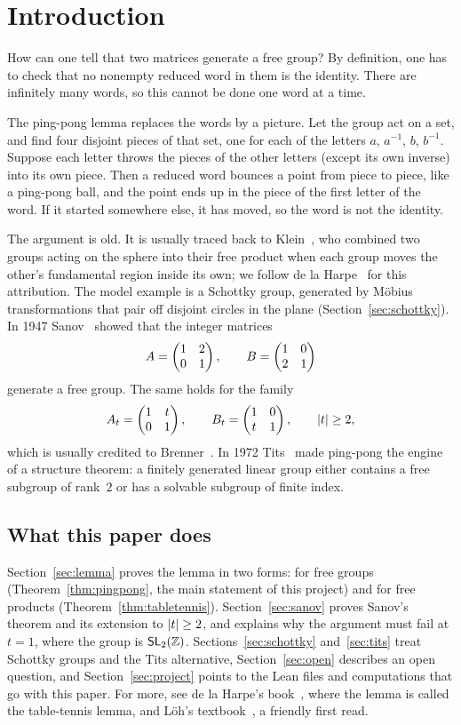 \section{Introduction}\label{sec:introduction}

How can one tell that two matrices generate a free group? By definition, one
has to check that no nonempty reduced word in them is the identity. There are
infinitely many words, so this cannot be done one word at a time.

The ping-pong lemma replaces the words by a picture. Let the group act on a set,
and find four disjoint pieces of that set, one for each of the letters $a$,
$a^{-1}$, $b$, $b^{-1}$. Suppose each letter throws the pieces of the other
letters (except its own inverse) into its own piece. Then a reduced word
bounces a point from piece to piece, like a ping-pong ball, and the point ends
up in the piece of the first letter of the word. If it started somewhere else,
it has moved, so the word is not the identity.

The argument is old. It is usually traced back to Klein~\cite{klein-1883}, who
combined two groups acting on the sphere into their free product when each
group moves the other's fundamental region inside its own; we follow de la
Harpe~\cite{delaharpe-2000} for this attribution. The model example is a
Schottky group, generated by M\"obius transformations that pair off disjoint
circles in the plane (Section~\ref{sec:schottky}). In 1947 Sanov~\cite{sanov-1947}
showed that the integer matrices
\[
  A = \begin{pmatrix} 1 & 2 \\ 0 & 1\end{pmatrix}, \qquad B = \begin{pmatrix} 1 & 0 \\ 2 & 1\end{pmatrix}
\]
generate a free group. The same holds for the family
\[
  A_t = \begin{pmatrix} 1 & t \\ 0 & 1\end{pmatrix}, \qquad B_t = \begin{pmatrix} 1 & 0 \\ t & 1\end{pmatrix}, \qquad \left|t\right| \ge 2,
\]
which is usually credited to Brenner~\cite{brenner-1955}. In 1972 Tits~\cite{tits-1972} made ping-pong the
engine of a structure theorem: a finitely generated linear group either
contains a free subgroup of rank~$2$ or has a solvable subgroup of finite
index.

\subsection*{What this paper does}
Section~\ref{sec:lemma} proves the lemma in two forms: for free groups
(Theorem~\ref{thm:pingpong}, the main statement of this project) and for free
products (Theorem~\ref{thm:tabletennis}). Section~\ref{sec:sanov} proves
Sanov's theorem and its extension to $\left|t\right| \ge 2$, and explains why the
argument must fail at $t = 1$, where the group is $\mathsf{SL}_2(\mathbb{Z})$. Sections~\ref{sec:schottky}
and~\ref{sec:tits} treat Schottky groups and the Tits alternative,
Section~\ref{sec:open} describes an open question, and
Section~\ref{sec:project} points to the Lean files and computations that go
with this paper. For more, see de la Harpe's book~\cite{delaharpe-2000},
where the lemma is called the table-tennis lemma, and L\"oh's
textbook~\cite{loh-2017}, a friendly first read.
